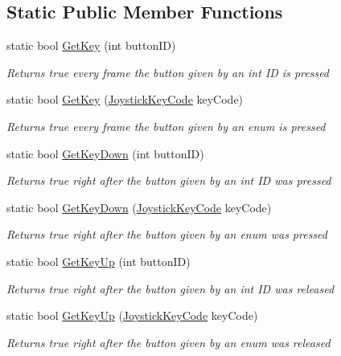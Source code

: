 \subsection*{Static Public Member Functions}
\begin{DoxyCompactItemize}
\item 
static bool \mbox{\hyperlink{class_game_pad_1_1_joystick_input_ae4523049ff819ce21db3c26e0b0982a0}{Get\+Key}} (int button\+ID)
\begin{DoxyCompactList}\small\item\em Returns true every frame the button given by an int ID is pressed \end{DoxyCompactList}\item 
static bool \mbox{\hyperlink{class_game_pad_1_1_joystick_input_ae8057dc9f36ed897d7ee191608fe87c6}{Get\+Key}} (\mbox{\hyperlink{namespace_game_pad_ac76b16e8c3ac78facd993c355ab2c337}{Joystick\+Key\+Code}} key\+Code)
\begin{DoxyCompactList}\small\item\em Returns true every frame the button given by an enum is pressed \end{DoxyCompactList}\item 
static bool \mbox{\hyperlink{class_game_pad_1_1_joystick_input_a9a0249a7226ddcd8262286ea78728528}{Get\+Key\+Down}} (int button\+ID)
\begin{DoxyCompactList}\small\item\em Returns true right after the button given by an int ID was pressed \end{DoxyCompactList}\item 
static bool \mbox{\hyperlink{class_game_pad_1_1_joystick_input_ae60ae4f44c406c04aa018a8f78ea1e2b}{Get\+Key\+Down}} (\mbox{\hyperlink{namespace_game_pad_ac76b16e8c3ac78facd993c355ab2c337}{Joystick\+Key\+Code}} key\+Code)
\begin{DoxyCompactList}\small\item\em Returns true right after the button given by an enum was pressed \end{DoxyCompactList}\item 
static bool \mbox{\hyperlink{class_game_pad_1_1_joystick_input_af9c09186831c47ce815527453bbfca61}{Get\+Key\+Up}} (int button\+ID)
\begin{DoxyCompactList}\small\item\em Returns true right after the button given by an int ID was released \end{DoxyCompactList}\item 
static bool \mbox{\hyperlink{class_game_pad_1_1_joystick_input_a373bc1035227b3ed1b03600610fe3d30}{Get\+Key\+Up}} (\mbox{\hyperlink{namespace_game_pad_ac76b16e8c3ac78facd993c355ab2c337}{Joystick\+Key\+Code}} key\+Code)
\begin{DoxyCompactList}\small\item\em Returns true right after the button given by an enum was released \end{DoxyCompactList}\end{DoxyCompactItemize}
